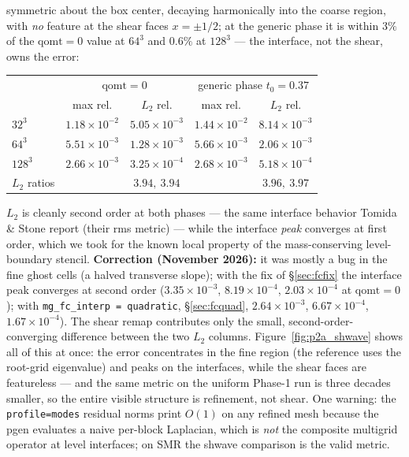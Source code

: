 \documentclass[11pt]{article}
\newcommand{\code}[1]{\texttt{#1}}
\begin{document}
symmetric about the box center, decaying harmonically into the coarse region, with
\emph{no} feature at the shear faces $x = \pm 1/2$; at the generic phase it is
within $3\%$ of the $\mathrm{qomt}{=}0$ value at $64^3$ and $0.6\%$ at $128^3$ ---
the interface, not the shear, owns the error:
\begin{center}
\small
\begin{tabular}{@{}lcccc@{}}
\toprule
 & \multicolumn{2}{c}{$\mathrm{qomt}=0$} & \multicolumn{2}{c}{generic phase $t_0=0.37$} \\
 & max rel. & $L_2$ rel. & max rel. & $L_2$ rel. \\
\midrule
$32^3$  & $1.18\times10^{-2}$ & $5.05\times10^{-3}$ & $1.44\times10^{-2}$ & $8.14\times10^{-3}$ \\
$64^3$  & $5.51\times10^{-3}$ & $1.28\times10^{-3}$ & $5.66\times10^{-3}$ & $2.06\times10^{-3}$ \\
$128^3$ & $2.66\times10^{-3}$ & $3.25\times10^{-4}$ & $2.68\times10^{-3}$ & $5.18\times10^{-4}$ \\
$L_2$ ratios & & $3.94,\ 3.94$ & & $3.96,\ 3.97$ \\
\bottomrule
\end{tabular}
\end{center}
$L_2$ is cleanly second order at both phases --- the same interface behavior Tomida
\& Stone report (their rms metric) --- while the interface \emph{peak} converges at
first order, which we took for the known local property of the mass-conserving
level-boundary stencil. \textbf{Correction (November 2026):} it was mostly a bug in the
fine ghost cells (a halved transverse slope); with the fix of \S\ref{sec:fcfix} the
interface peak converges at second order ($3.35\times10^{-3}$, $8.19\times10^{-4}$,
$2.03\times10^{-4}$ at $\mathrm{qomt} = 0$); with \code{mg\_fc\_interp = quadratic}, \S\ref{sec:fcquad},
$2.64\times10^{-3}$, $6.67\times10^{-4}$, $1.67\times10^{-4}$).
The shear remap contributes only the small, second-order-converging difference
between the two $L_2$ columns. Figure~\ref{fig:p2a_shwave} shows all of this at
once: the error concentrates in the fine region (the reference uses the root-grid
eigenvalue) and peaks on the interfaces, while the shear faces are featureless ---
and the same metric on the uniform Phase-1 run is three decades smaller, so the
entire visible structure is refinement, not shear.
One warning: the \code{profile=modes} residual norms
print $O(1)$ on any refined mesh because the pgen evaluates a naive per-block
Laplacian, which is \emph{not} the composite multigrid operator at level interfaces;
on SMR the shwave comparison is the valid metric.
\end{document}
